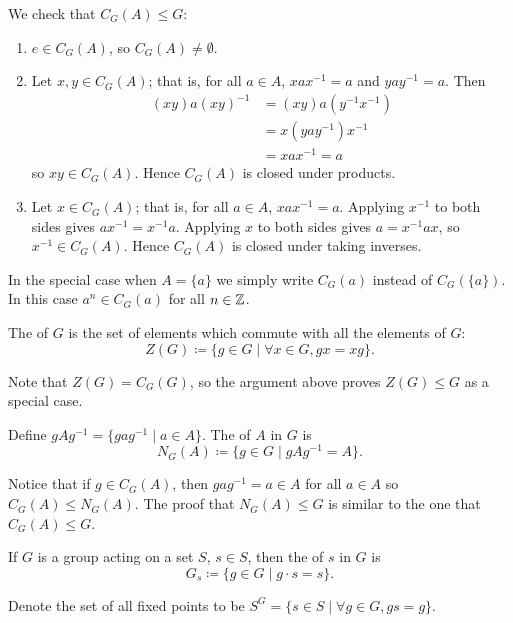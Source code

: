 We check that $C_G(A)\le G$:
\begin{enumerate}[label=(\roman*)]
\item $e\in C_G(A)$, so $C_G(A)\neq\emptyset$.
\item Let $x,y\in C_G(A)$; that is, for all $a\in A$, $xax^{-1}=a$ and $yay^{-1}=a$. Then
\begin{align*}
(xy)a(xy)^{-1}&=(xy)a(y^{-1}x^{-1})\\
&=x(yay^{-1})x^{-1}\\
&=xax^{-1}=a
\end{align*}
so $xy\in C_G(A)$. Hence $C_G(A)$ is closed under products.
\item Let $x\in C_G(A)$; that is, for all $a\in A$, $xax^{-1}=a$. Applying $x^{-1}$ to both sides gives $ax^{-1}=x^{-1}a$. Applying $x$ to both sides gives $a=x^{-1}ax$, so $x^{-1}\in C_G(A)$. Hence $C_G(A)$ is closed under taking inverses.
\end{enumerate}

\begin{notation}
In the special case when $A=\{a\}$ we simply write $C_G(a)$ instead of $C_G(\{a\})$. In this case $a^n\in C_G(a)$ for all $n\in\mathbb Z$.
\end{notation}

\begin{definition}[Centre]
The  of $G$ is the set of elements which commute with all the elements of $G$:
\[Z(G)\coloneqq\{g\in G\mid\forall x\in G,gx=xg\}.\]
\end{definition}

Note that $Z(G)=C_G(G)$, so the argument above proves $Z(G)\le G$ as a special case.

\begin{definition}[Normaliser]
Define $gAg^{-1}=\{gag^{-1}\mid a\in A\}$. The  of $A$ in $G$ is
\[N_G(A)\coloneqq\{g\in G\mid gAg^{-1}=A\}.\]
\end{definition}

Notice that if $g\in C_G(A)$, then $gag^{-1}=a\in A$ for all $a\in A$ so $C_G(A)\le N_G(A)$. The proof that $N_G(A)\le G$ is similar to the one that $C_G(A)\le G$.

\begin{definition}[Stabiliser]
If $G$ is a group acting on a set $S$, $s\in S$, then the  of $s$ in $G$ is
\[G_s\coloneqq\{g\in G\mid g\cdot s=s\}.\]
\end{definition}

\begin{notation}
Denote the set of all fixed points to be $S^G=\{s\in S\mid\forall g\in G, gs=g\}$.
\end{notation}

